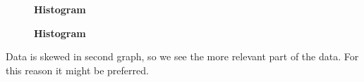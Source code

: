 \documentclass[letterpaper,12pt]{article}
\theoremstyle{definition}
\begin{document}
\begin{figure}[htb]\centering \captionsetup{width=4.0in}
        \caption{\label{Histogram<800}\textbf{Histogram }}
\end{figure}



\begin{figure}[htb]\centering \captionsetup{width=4.0in}
        \caption{\label{Histogram<800}\textbf{Histogram}}
\end{figure}
Data is skewed in second graph, so we see the more relevant part of the data. For this reason it might be preferred.
\end{document}
